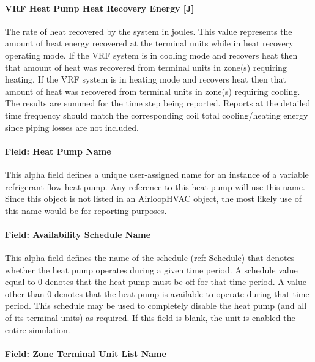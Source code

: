 \paragraph{\texorpdfstring{VRF Heat Pump Heat Recovery Energy {[}J{]}}{VRF Heat Pump Heat Recovery Energy}}\label{vrf-heat-pump-heat-recovery-energy}

The rate of heat recovered by the system in joules. This value represents the amount of heat energy recovered at the terminal units while in heat recovery operating mode. If the VRF system is in cooling mode and recovers heat then that amount of heat was recovered from terminal units in zone(s) requiring heating. If the VRF system is in heating mode and recovers heat then that amount of heat was recovered from terminal units in zone(s) requiring cooling. The results are summed for the time step being reported. Reports at the detailed time frequency should match the corresponding coil total cooling/heating energy since piping losses are not included.

\paragraph{Field: Heat Pump Name}\label{field-heat-pump-name-1}

This alpha field defines a unique user-assigned name for an instance of a variable refrigerant flow heat pump. Any reference to this heat pump will use this name. Since this object is not listed in an AirloopHVAC object, the most likely use of this name would be for reporting purposes.

\paragraph{Field: Availability Schedule Name}\label{field-availability-schedule-name-1-013}

This alpha field defines the name of the schedule (ref: Schedule) that denotes whether the heat pump operates during a given time period. A schedule value equal to 0 denotes that the heat pump must be off for that time period. A value other than 0 denotes that the heat pump is available to operate during that time period. This schedule may be used to completely disable the heat pump (and all of its terminal units) as required. If this field is blank, the unit is enabled the entire simulation.

\paragraph{Field: Zone Terminal Unit List Name}\label{field-zone-terminal-unit-list-name-1}

